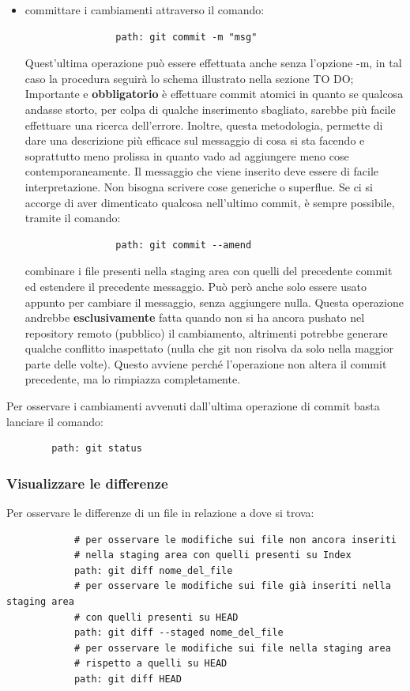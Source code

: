 \begin{itemize}
			\item committare i cambiamenti attraverso il comando:
				\begin{verbatim}
				path: git commit -m "msg"
				\end{verbatim}
				\noindent
				Quest'ultima operazione può essere effettuata anche senza l'opzione -m, in tal caso la procedura seguirà lo schema illustrato nella sezione TO DO; \newline
				Importante e \textbf{obbligatorio} è effettuare commit atomici in quanto se qualcosa andasse storto, per colpa di qualche inserimento sbagliato, sarebbe più facile effettuare una ricerca dell'errore. Inoltre, questa metodologia, permette di dare una descrizione più efficace sul messaggio di cosa si sta facendo e soprattutto meno prolissa in quanto vado ad aggiungere meno cose contemporaneamente. \newline
				Il messaggio che viene inserito deve essere di facile interpretazione. Non bisogna scrivere cose generiche o superflue. \newline
				Se ci si accorge di aver dimenticato qualcosa nell'ultimo commit, è sempre possibile, tramite il comando:
				\begin{verbatim}
				path: git commit --amend
				\end{verbatim}
				combinare i file presenti nella staging area con quelli del precedente commit ed estendere il precedente messaggio. Può però anche solo essere usato appunto per cambiare il messaggio, senza aggiungere nulla.\newline
				Questa operazione andrebbe \textbf{esclusivamente} fatta quando non si ha ancora pushato nel repository remoto (pubblico) il cambiamento, altrimenti potrebbe generare qualche conflitto inaspettato (nulla che git non risolva da solo nella maggior parte delle volte). Questo avviene perché l'operazione non altera il commit precedente, ma lo rimpiazza completamente.
				 
		\end{itemize}
	\noindent
	Per osservare i cambiamenti avvenuti dall'ultima operazione di commit basta lanciare il comando:
		\begin{verbatim}
		path: git status
		\end{verbatim}

	
		\subsubsection{Visualizzare le differenze} %
		\label{ssub:visualizzare_le_differenze}
		Per osservare le differenze di un file in relazione a dove si trova:
			\begin{verbatim}
			# per osservare le modifiche sui file non ancora inseriti
			# nella staging area con quelli presenti su Index
			path: git diff nome_del_file
			# per osservare le modifiche sui file già inseriti nella staging area
			# con quelli presenti su HEAD
			path: git diff --staged nome_del_file
			# per osservare le modifiche sui file nella staging area
			# rispetto a quelli su HEAD
			path: git diff HEAD
			\end{verbatim}

